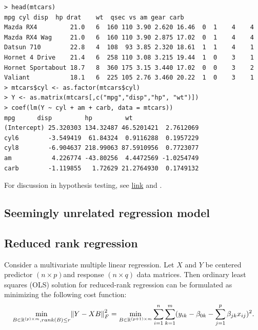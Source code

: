 \begin{refsection}
\begin{example}[R example]\hfill
\begin{verbatim}
> head(mtcars)
mpg cyl disp  hp drat    wt  qsec vs am gear carb
Mazda RX4         21.0   6  160 110 3.90 2.620 16.46  0  1    4    4
Mazda RX4 Wag     21.0   6  160 110 3.90 2.875 17.02  0  1    4    4
Datsun 710        22.8   4  108  93 3.85 2.320 18.61  1  1    4    1
Hornet 4 Drive    21.4   6  258 110 3.08 3.215 19.44  1  0    3    1
Hornet Sportabout 18.7   8  360 175 3.15 3.440 17.02  0  0    3    2
Valiant           18.1   6  225 105 2.76 3.460 20.22  1  0    3    1
> mtcars$cyl <- as.factor(mtcars$cyl)
> Y <- as.matrix(mtcars[,c("mpg","disp","hp", "wt")])
> coef(lm(Y ~ cyl + am + carb, data = mtcars))
mpg      disp         hp         wt
(Intercept) 25.320303 134.32487 46.5201421  2.7612069
cyl6        -3.549419  61.84324  0.9116288  0.1957229
cyl8        -6.904637 218.99063 87.5910956  0.7723077
am           4.226774 -43.80256  4.4472569 -1.0254749
carb        -1.119855   1.72629 21.2764930  0.1749132
\end{verbatim}	
\end{example}

\begin{remark}
For discussion in hypothesis testing, see \href{http://users.stat.umn.edu/~helwig/notes/mvlr-Notes.pdf}{link} and \cite{velu1998multivariate}. 
\end{remark}

\subsection{Seemingly unrelated regression model}






\subsection{Reduced rank regression}

\begin{definition}
Consider a multivariate multiple linear regression. Let $X$ and $Y$ be centered predictor $(n\times p)$and response $(n\times q)$ data matrices. Then ordinary least squares (OLS) solution for reduced-rank regression can be formulated as minimizing the following cost function:
$$\min_{B\in \mathbb{R}^{(p)\times m}, rank(B)\leq r} \norm{Y - XB}^2_F = \min_{B\in \mathbb{R}^{(p+1)\times m}} \sum_{i=1}^n \sum_{k=1}^m (y_{ik} - \beta_{0k} - \sum_{j=1}^p \beta_{jk}x_{ij})^2. $$	
\end{definition}



\end{refsection}
